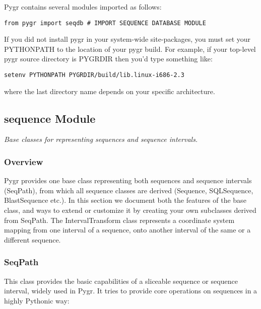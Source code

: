 \documentclass{howto}
\begin{document}
Pygr contains several modules imported as follows:
\begin{verbatim}
from pygr import seqdb # IMPORT SEQUENCE DATABASE MODULE
\end{verbatim}

If you did not install pygr in your system-wide site-packages, you 
must set your PYTHONPATH to the location of your pygr build.
For example, if your top-level pygr source directory is PYGRDIR then
you'd type something like:
\begin{verbatim}
setenv PYTHONPATH PYGRDIR/build/lib.linux-i686-2.3
\end{verbatim}
where the last directory name depends on your specific architecture.


\subsection{sequence Module}
\label{sequence}

{\em Base classes for representing sequences and sequence intervals.}


\subsubsection{Overview}
Pygr provides one base class representing both sequences and sequence intervals (SeqPath),
from which all sequence classes are derived (Sequence, SQLSequence, BlastSequence etc.).
In this section we document both the features of the base class, and ways to extend or
customize it by creating your own subclasses derived from SeqPath.  The IntervalTransform
class represents a coordinate system mapping from one interval of a sequence, onto 
another interval of the same or a different sequence.

\subsubsection{SeqPath}
This class provides the basic capabilities of a sliceable sequence or sequence interval,
widely used in Pygr.  It tries to provide core operations on sequences in a highly
Pythonic way:
\end{document}
